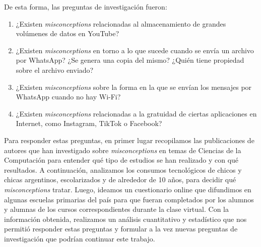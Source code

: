De esta forma, las preguntas de investigación fueron:
\begin{enumerate}
\item ¿Existen \textit{misconceptions} relacionadas al almacenamiento de grandes volúmenes de datos en YouTube?
\item ¿Existen \textit{misconceptions} en torno a lo que sucede cuando se envía un archivo por WhatsApp? ¿Se genera una copia del mismo? ¿Quién tiene propiedad sobre el archivo enviado?
\item ¿Existen \textit{misconceptions} sobre la forma en la que se envían los mensajes por WhatsApp cuando no hay Wi-Fi?
\item ¿Existen \textit{misconceptions} relacionadas a la gratuidad de ciertas aplicaciones en Internet, como Instagram, TikTok o Facebook?
\end{enumerate}

Para responder estas preguntas, en primer lugar recopilamos las publicaciones de autores que han investigado sobre \textit{misconceptions} en temas de Ciencias de la Computación para entender qué tipo de estudios se han realizado y con qué resultados. A continuación, analizamos los consumos tecnológicos de chicos y chicas argentinos, escolarizados y de alrededor de 10 años, para decidir qué \textit{misconceptions} tratar. Luego, ideamos un cuestionario online que difundimos en algunas escuelas primarias del país para que fueran completados por los alumnos y alumnas de los cursos correspondientes durante la clase virtual. Con la información obtenida, realizamos un análisis cuantitativo y estadístico que nos permitió responder estas preguntas y formular a la vez nuevas preguntas de investigación que podrían continuar este trabajo.